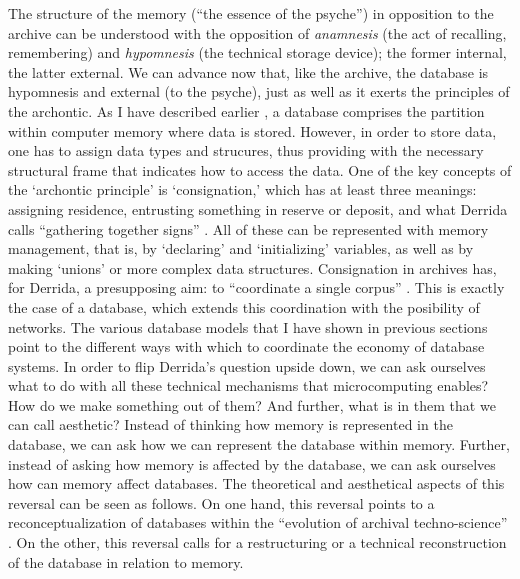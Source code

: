 The structure of the memory (``the essence of the psyche'') in opposition to the archive can be understood with the opposition of \textit{anamnesis} (the act of recalling, remembering) and \textit{hypomnesis} (the technical storage device); the former internal, the latter external. We can advance now that, like the archive, the database is hypomnesis and external (to the psyche), just as well as it exerts the principles of the archontic. As I have described earlier , a database comprises the partition within computer memory where data is stored. However, in order to store data, one has to assign data types and strucures, thus providing with the necessary structural frame that indicates how to access the data. One of the key concepts of the `archontic principle' is `consignation,' which has at least three meanings: assigning residence, entrusting something in reserve or deposit, and what Derrida calls ``gathering together signs'' \parencite[10]{Der95:Arc}. All of these can be represented with memory management, that is, by `declaring' and `initializing' variables, as well as by making `unions' or more complex data structures. Consignation in archives has, for Derrida, a presupposing aim: to ``coordinate a single corpus'' \parencite[10]{Der95:Arc}. This is exactly the case of a database, which extends this coordination with the posibility of networks. The various database models that I have shown in previous sections point to the different ways with which to coordinate the economy of database systems. In order to flip Derrida's question upside down, we can ask ourselves what to do with all these technical mechanisms that microcomputing enables? How do we make something out of them? And further, what is in them that we can call aesthetic? Instead of thinking how memory is represented in the database, we can ask how we can represent the database within memory. Further, instead of asking how memory is affected by the database, we can ask ourselves how can memory affect databases. The theoretical and aesthetical aspects of this reversal can be seen as follows. On one hand, this reversal points to a reconceptualization of databases within the ``evolution of archival techno-science'' \parencite[16]{Der95:Arc}. On the other, this reversal calls for a restructuring or a technical reconstruction of the database in relation to memory. 



